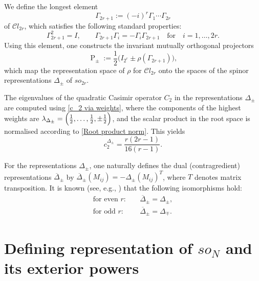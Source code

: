 \documentclass[a4paper]{article}
\newcommand{\Cl}{\mathcal{C}l}
\newcommand{\oDelta}{\overline{\Delta}}
\renewcommand{\=}{\ =\ }
\DeclareMathOperator{\proj}{P}
\numberwithin{equation}{section}
\theoremstyle{remark}
\begin{document}
We define the longest element
\begin{equation}
\Gamma_{2r+1}:=(-i)^r \Gamma_1\cdots\Gamma_{2r}
\end{equation}
of $\Cl_{2r}$, which satisfies the following standard properties:
\begin{equation}\label{Gamma_N+1 properties}
\Gamma_{2r+1}^2=I, \qquad \Gamma_{2r+1}\Gamma_i=-\Gamma_i\Gamma_{2r+1} \quad \text{for} \quad i=1,\dots,2r.
\end{equation}
Using this element, one constructs the invariant mutually orthogonal projectors
\begin{equation}\label{rho to Delta_pm projectors}
\proj_{\pm} := \frac{1}{2} \bigl(I_{2^r}\pm \rho(\Gamma_{2r+1})\bigr),
\end{equation}
which map the representation space of $\rho$ for $\Cl_{2r}$ onto the spaces of the spinor representations $\Delta_\pm$ of $so_{2r}$.

The eigenvalues of the quadratic Casimir operator $C_2$ in the representations $\Delta_\pm$ are computed using \eqref{c_2 via weights}, where the components of the highest weights are $\lambda_{\Delta_\pm} = \Bigl(\frac{1}{2},\dots,\frac{1}{2},\pm\frac{1}{2}\Bigr)$, and the scalar product in the root space is normalised according to \eqref{Root product norm}.
This yields
\begin{equation}\label{c_2 on Delta_pm}
c_2^{\Delta_\pm} = \frac{r(2r-1)}{16(r-1)}.
\end{equation}

For the representations $\Delta_\pm$, one naturally defines the dual (contragredient) representations $\overline{\Delta}_\pm$ by $\oDelta_\pm(M_{ij}) = -\Delta_\pm(M_{ij})^T$, where $T$ denotes matrix transposition. It is known (see, e.g., \cite{IsRu2}) that the following isomorphisms hold:
\begin{equation}\label{Delta bar(Delta) iso}
\begin{aligned}
\text{for even $r$}:\quad &\oDelta_\pm=\Delta_\pm,\\
\text{for odd $r$}:\quad &\oDelta_\pm=\Delta_{\mp}.
\end{aligned}
\end{equation}


\section{Defining representation of $so_N$ and its exterior powers}\label{app: so_N and its external powers}
\end{document}
